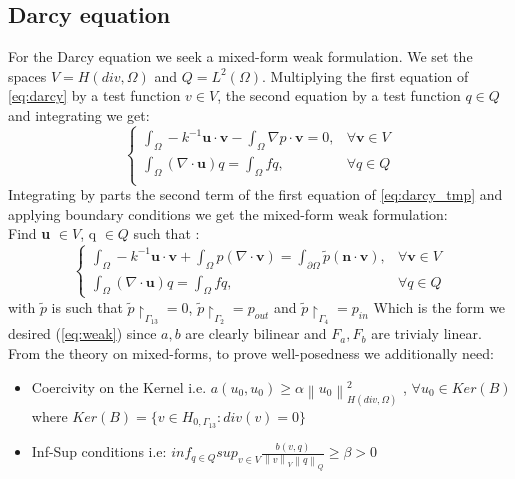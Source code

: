 \documentclass[conference]{IEEEtran}
\newcommand{\norm}[1]{\left\lVert#1\right\rVert}
\begin{document}
\subsection{Darcy equation}
For the Darcy equation we seek a mixed-form weak formulation. We set the spaces
$V=H(div,\Omega)$ and $Q=L^2(\Omega)$. Multiplying the first equation of \ref{eq:darcy} by a test function $v\in V$, the second equation by a test function $q\in Q$ and integrating we get:
\begin{equation}
    \begin{cases}
      \int_\Omega-k^{-1}\textbf{u}\cdot \textbf{v} 
      -\int_\Omega \nabla p \cdot \textbf{v} = 0 , & \forall \textbf{v} \in V  \\
      \int_\Omega (\nabla \cdot \textbf{u})q = \int_\Omega fq, & \forall q \in Q \\
    \end{cases}
    \label{eq:darcy_tmp}
\end{equation}
Integrating by parts the second term of the first equation of \ref{eq:darcy_tmp} and applying boundary conditions we get the mixed-form weak formulation:\\
Find \textbf{u} $\in V$, q $\in Q$ such that  :
\begin{equation}
    \begin{cases}
      \int_\Omega -k^{-1}\textbf{u}\cdot \textbf{v} + \int_\Omega  p (\nabla\cdot \textbf{v})
      = \int_{\partial\Omega}  \tilde{p} (\textbf{n}\cdot \textbf{v})  , & \forall \textbf{v} \in V  \\
      \int_\Omega (\nabla \cdot \textbf{u})q = \int_\Omega fq, & \forall q \in Q 
    \end{cases}
    \label{eq:darcy_weak}
\end{equation}
with $\tilde{p}$ is such that $\tilde{p}{\restriction}_{\Gamma_{13}} = 0 $, $\tilde{p}{\restriction}_{\Gamma_2} = p_{out} $ and $\tilde{p}{\restriction}_{\Gamma_4} = p_{in} $
Which is the form we desired (\ref{eq:weak}) since $a,b$ are clearly bilinear and $F_a,F_b$ are trivialy linear. \\
From the theory on mixed-forms, to prove well-posedness we additionally need:
\begin{itemize}
\item Coercivity on the Kernel i.e. $a(u_0,u_0) \geq \alpha \norm{u_0}_{H(div,\Omega)}^2$ , $\forall u_0 \in Ker(B)$ where $Ker(B)=\{v \in H_{0,\Gamma_{13}} : div(v)=0 \}$
\item Inf-Sup conditions i.e: $ inf_{q\in Q} sup_{v\in V} \frac{ b(v,q) }{ \norm{v}_V \norm{q}_Q } \geq \beta >0   $ 
\end{itemize}
\end{document}
